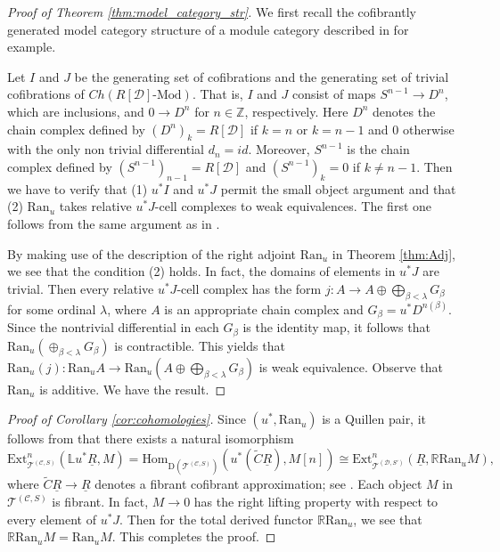 \documentclass{amsart}
\theoremstyle{definition}
\theoremstyle{remark}
\newcommand{\K}{R}%
\newcommand{\C}{{\mathcal C}}
\newcommand{\T}{{\mathcal T}}
\newcommand{\D}{\mathcal{D}}
\begin{document}
\begin{proof}[Proof of Theorem \ref{thm:model_category_str}]
We first recall the cofibrantly generated model category structure of a module category 
described in \cite[Theorem 2.3.11]{Hovey} for example.  

Let $I$ and $J$ be the generating set of cofibrations and the generating set of trivial cofibrations of $Ch(\K[\D]\text{-Mod})$. 
That is, $I$ and  $J$ consist of maps $S^{n-1} \to D^n$, which are inclusions, and $0 \to D^n$ for $n \in {\mathbb Z}$, respectively.  
Here $D^n$ denotes the chain complex defined by $(D^n)_k = \K[\D]$ if $k = n$ or $k = n-1$ and $0$ otherwise with the only non trivial 
differential $d_n = id$. Moreover,  $S^{n-1}$ is the chain complex defined by $(S^{n-1})_{n-1} = \K[\D]$ and 
$(S^{n-1})_{k} = 0$ if $k \neq n-1$. 
Then we have to verify that (1) $u^*I$ and $u^*J$ permit the small object argument and that (2) $\text{Ran}_{u}$ takes relative 
$u^*J$-cell complexes to weak equivalences. The first one follows from the same argument as in 
\cite[Exmaple 2.1.6]{Hovey}. 

By making use of the description of the right adjoint $\text{Ran}_{u}$ in Theorem \ref{thm:Adj}, 
we see that the condition (2) holds. In fact, the domains of elements in $u^*J$ are trivial. Then every relative $u^*J$-cell complex 
has the form $j : A \to A \oplus \displaystyle{\bigoplus}_{\beta < \lambda} G_\beta$ for some ordinal $\lambda$, 
where $A$ is an appropriate chain complex and $G_\beta = u^*D^{n(\beta)}$. 
Since the nontrivial differential in each $G_\beta$ is the identity map, 
it follows that $\text{Ran}_u ({\oplus}_{\beta < \lambda} G_\beta)$ is contractible. This yields that 
$\text{Ran}_u(j) : \text{Ran}_uA \to \text{Ran}_u(A \oplus \displaystyle{\bigoplus}_{\beta < \lambda} G_\beta)$ is weak equivalence. 
Observe that $\text{Ran}_u$ is additive. We have the result. 
\end{proof}

\begin{proof}[Proof of Corollary \ref{cor:cohomologies}]
Since $(u^*, \text{Ran}_u)$ is a Quillen pair, it follows from \cite[Theorem 8.5.18]{Hir} that there exists a natural isomorphism 
$$ 
\text{Ext}_{\T^{(\C, S)}}^n({\mathbb L}u^* \underline{\K}, M) = 
\text{Hom}_{\text{D}(\T^{(\C, S)})}(u^*(\widetilde{C}\underline{\K}),  M[n]) \cong 
\text{Ext}_{\T^{(\D, S')}}^n(\underline{\K}, {\mathbb R}\text{Ran}_u M), 
$$ 
where $\widetilde{C}\underline{\K} \to \underline{\K}$ denotes a fibrant cofibrant approximation; 
see \cite[Definition 8.1.2, Proposition 8.1.3]{Hir}.  
Each object $M$ in $\T^{(\C, S)}$ is fibrant. In fact, $M \to 0$ has the right lifting property with respect to every element of 
$u^*J$.  
Then for the total derived functor ${\mathbb R}\text{Ran}_u$, 
we see that ${\mathbb R}\text{Ran}_uM = \text{Ran}_uM$. This completes the proof.
\end{proof}
\end{document}
